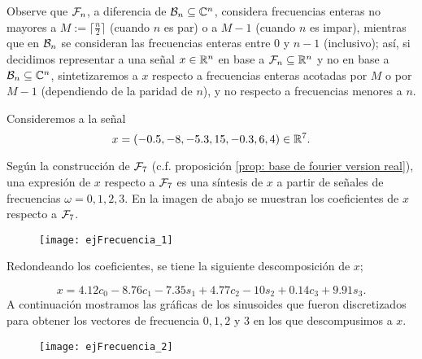 \begin{nota}
\label{nota: frecuencias en las bases de fourier}
Observe que $\mathcal{F}_{n}$, a diferencia de $\mathcal{B}_{n} \subseteq \mathbb{C}^{n}$, 
considera frecuencias enteras no mayores a $M := \lceil \frac{n}{2} \rceil$
(cuando $n$ es par) o a $M-1$ (cuando $n$ es impar), mientras que
en $\mathcal{B}_{n}$ se consideran las frecuencias enteras entre $0$
y $n-1$ (inclusivo); así, si decidimos representar
a una señal $x \in \mathbb{R}^{n}$ en base a $\mathcal{F}_{n} \subseteq \mathbb{R}^{n}$
y no en base a $\mathcal{B}_{n} \subseteq \mathbb{C}^{n}$, sintetizaremos a $x$
respecto a frecuencias enteras acotadas por $M$ o por $M-1$ 
(dependiendo de la paridad de $n$), y no respecto a frecuencias
menores a $n$.
\end{nota}

\begin{ejemplo}
Consideremos a la señal 
\begin{equation}
\label{eq2: 10ab}
x=(-0.5,-8,-5.3,15,-0.3,6,4) \in \mathbb{R}^{7}.
\end{equation}

Según la construcción de $\mathcal{F}_{7}$ (c.f. 
proposición \ref{prop: base de fourier version real}),
una expresión de $x$ respecto a $\mathcal{F}_{7}$ 
es una síntesis de $x$ a partir de señales 
de frecuencias $\omega = 0,1,2,3$. En la imagen de abajo
se muestran los coeficientes de $x$ respecto a $\mathcal{F}_{7}$.

\begin{figure}[H]
	\centering
	\texttt{[image: ejFrecuencia\_1]} 
\end{figure}	

Redondeando los coeficientes, 
se tiene la siguiente descomposición de $x$;

\[
x = 4.12 c_{0} - 8.76c_{1} -7.35s_{1}+
4.77c_{2}-10s_{2}+0.14c_{3}+9.91s_{3}.
\]
A continuación mostramos las gráficas
de los sinusoides que fueron discretizados
para obtener los vectores de frecuencia
$0,1,2$ y $3$ en los que descompusimos a $x$.

\begin{figure}[H]
	\centering
	\texttt{[image: ejFrecuencia\_2]} 
\end{figure}	


\end{ejemplo}
